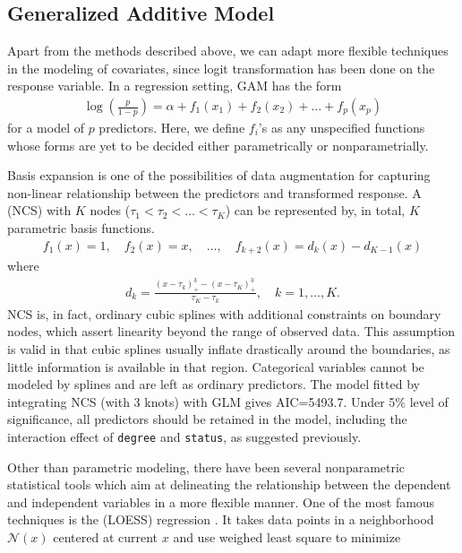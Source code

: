 \subsection{Generalized Additive Model}
Apart from the methods described above, we can adapt more flexible techniques in the modeling of covariates, since logit transformation has been done on the response variable. In a regression setting, GAM has the form
\begin{align}
\log\left(\frac{p}{1-p}\right)=\alpha+f_1(x_1)+f_2(x_2)+\dots+f_p(x_p)
\end{align}
for a model of $p$ predictors. Here, we define $f_i$'s as any unspecified functions whose forms are yet to be decided either parametrically or nonparametrially. 
\par Basis expansion is one of the possibilities of data augmentation for capturing non-linear relationship between the predictors and transformed response. A  (NCS) \cite{Friedman:2001:ESL} with $K$ nodes ($\tau_1<\tau_2<\dots<\tau_K$) can be represented by, in total, $K$ parametric basis functions.
\begin{align}
f_1(x)=1,\quad f_2(x)=x, \quad \ldots, \quad f_{k+2}(x)=d_k(x)-d_{K-1}(x)
\end{align}
where
\begin{align}
d_{k}=\frac{(x-\tau_k)^3_+-(x-\tau_K)^3_+}{\tau_K-\tau_k},\quad k=1,\dots,K.
\end{align}
NCS is, in fact, ordinary cubic splines with additional constraints on boundary nodes, which assert linearity beyond the range of observed data. This assumption is valid in that cubic splines usually inflate drastically around the boundaries, as little information is available in that region. Categorical variables cannot be modeled by splines and are left as ordinary predictors. The model fitted by integrating NCS (with 3 knots) with GLM gives AIC=5493.7. Under 5\% level of significance, all predictors should be retained in the model, including the interaction effect of \texttt{degree} and \texttt{status}, as suggested previously.
\par Other than parametric modeling, there have been several nonparametric statistical tools which aim at delineating the relationship between the dependent and independent variables in a more flexible manner. One of the most famous techniques is the  (LOESS) regression \cite{Friedman:2001:ESL}. It takes data points in a neighborhood $\mathcal{N}(x)$ centered at current $x$ and use weighed least square to minimize
